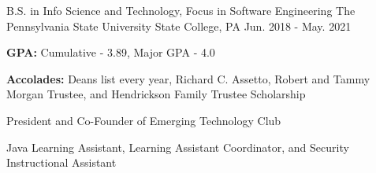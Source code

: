 

\begin{cventries}

  \cventry
    {B.S. in Info Science and Technology, Focus in Software Engineering}
    {The Pennsylvania State University} %
    {State College, PA} %
    {Jun. 2018 - May. 2021} %
    {
      \begin{cvitems} %
        \item {\textbf{GPA:} Cumulative - 3.89, Major GPA - 4.0}
        \item {\textbf{Accolades:} Deans list every year, Richard C. Assetto, Robert and Tammy Morgan Trustee, and Hendrickson Family Trustee Scholarship}
        \item {President and Co-Founder of Emerging Technology Club}
        \item {Java Learning Assistant, Learning Assistant Coordinator, and Security Instructional Assistant}
      \end{cvitems}
    }

\end{cventries}
